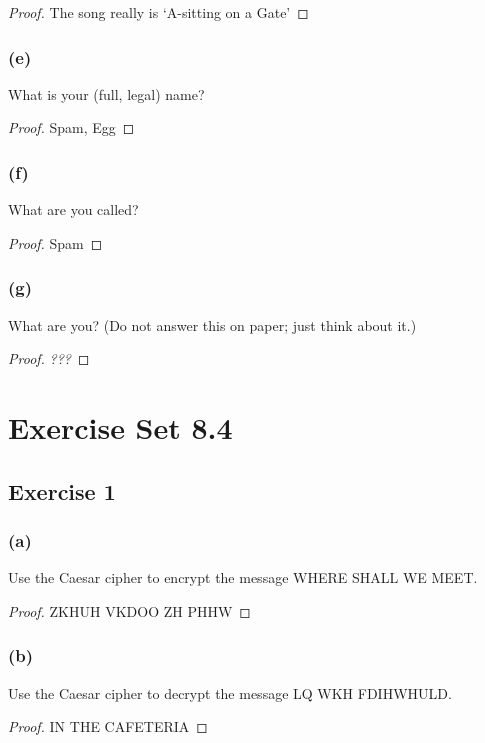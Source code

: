 \documentclass[14pt]{extarticle}
\begin{document}
\begin{proof}
The song really is ‘A-sitting on a Gate’
\end{proof}

\subsubsection{(e)}
What is your (full, legal) name?

\begin{proof}
Spam, Egg
\end{proof}

\subsubsection{(f)}
What are you called?

\begin{proof}
Spam
\end{proof}

\subsubsection{(g)}
What are you? (Do not answer this on paper; just think about it.)

\begin{proof}
{\it ???}
\end{proof}

\section{Exercise Set 8.4}

\subsection{Exercise 1}
\subsubsection{(a)}
Use the Caesar cipher to encrypt the message WHERE SHALL WE MEET.

\begin{proof}
ZKHUH VKDOO ZH PHHW
\end{proof}

\subsubsection{(b)}
Use the Caesar cipher to decrypt the message LQ WKH FDIHWHULD.

\begin{proof}
IN THE CAFETERIA
\end{proof}
\end{document}
